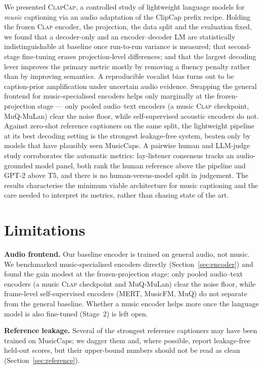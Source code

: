 \documentclass[9pt]{report}
\newcommand{\clapenc}{\textsc{Clap}}
\newcommand{\sys}{\textsc{ClapCap}}
\begin{document}
We presented \sys{}, a controlled study of lightweight language models for \emph{music}
captioning via an audio adaptation of the ClipCap prefix recipe. Holding the frozen \clapenc{}
encoder, the projection, the data split and the evaluation fixed, we found that a decoder-only
and an encoder--decoder LM are statistically indistinguishable at baseline once run-to-run
variance is measured; that second-stage fine-tuning erases projection-level differences; and
that the largest decoding lever improves the primary metric mostly by removing a fluency penalty
rather than by improving semantics. A reproducible vocalist bias turns out to be
caption-prior amplification under uncertain audio evidence. Swapping the general frontend for
music-specialised encoders helps only marginally at the frozen-projection stage --- only pooled
audio--text encoders (a music \clapenc{} checkpoint, MuQ-MuLan) clear the noise floor, while
self-supervised acoustic encoders do not. Against zero-shot reference captioners on the same
split, the lightweight pipeline at its best decoding setting is the strongest leakage-free
system, beaten only by models that have plausibly seen MusicCaps. A pairwise human and
LLM-judge study corroborates the automatic metrics: lay-listener consensus tracks an
audio-grounded model panel, both rank the human reference above the pipeline and GPT-2 above T5,
and there is no human-versus-model split in judgement. The results characterise the minimum
viable architecture for music captioning and the care needed to interpret its metrics, rather
than chasing state of the art.

\section{Limitations}

\textbf{Audio frontend.} Our baseline encoder is trained on general audio, not music. We
benchmarked music-specialised encoders directly (Section~\ref{sec:encoder}) and found the gain
modest at the frozen-projection stage: only pooled audio--text encoders (a music \clapenc{}
checkpoint and MuQ-MuLan) clear the noise floor, while frame-level self-supervised encoders
(MERT, MusicFM, MuQ) do not separate from the general baseline. Whether a music encoder helps
more once the language model is also fine-tuned (Stage~2) is left open.

\textbf{Reference leakage.} Several of the strongest reference captioners may have been trained
on MusicCaps; we dagger them and, where possible, report leakage-free held-out scores, but their
upper-bound numbers should not be read as clean (Section~\ref{sec:reference}).
\end{document}
